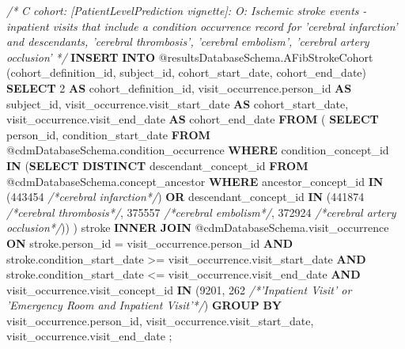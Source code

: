\documentclass[]{article}
\newenvironment{Shaded}{\begin{snugshade}}{\end{snugshade}}
\newcommand{\KeywordTok}[1]{\textcolor[rgb]{0.13,0.29,0.53}{\textbf{#1}}}
\newcommand{\DecValTok}[1]{\textcolor[rgb]{0.00,0.00,0.81}{#1}}
\newcommand{\CommentTok}[1]{\textcolor[rgb]{0.56,0.35,0.01}{\textit{#1}}}
\newcommand{\NormalTok}[1]{#1}
\begin{document}
\begin{Shaded}
\begin{Highlighting}[]
\CommentTok{/*}
\CommentTok{  C cohort:  [PatientLevelPrediction vignette]:  O: Ischemic stroke events}
\CommentTok{  - inpatient visits that include a condition occurrence record for }
\CommentTok{    'cerebral infarction' and descendants, 'cerebral thrombosis', }
\CommentTok{    'cerebral embolism', 'cerebral artery occlusion' }
\CommentTok{*/}
\KeywordTok{INSERT} \KeywordTok{INTO}\NormalTok{ @resultsDatabaseSchema.AFibStrokeCohort (cohort_definition_id, subject_id, }
\NormalTok{                                                     cohort_start_date, cohort_end_date)}
\KeywordTok{SELECT} \DecValTok{2} \KeywordTok{AS}\NormalTok{ cohort_definition_id,}
\NormalTok{  visit_occurrence.person_id }\KeywordTok{AS}\NormalTok{ subject_id,}
\NormalTok{  visit_occurrence.visit_start_date }\KeywordTok{AS}\NormalTok{ cohort_start_date,}
\NormalTok{  visit_occurrence.visit_end_date }\KeywordTok{AS}\NormalTok{ cohort_end_date}
\KeywordTok{FROM}  
\NormalTok{(}
  \KeywordTok{SELECT}\NormalTok{ person_id, condition_start_date}
  \KeywordTok{FROM}\NormalTok{ @cdmDatabaseSchema.condition_occurrence}
  \KeywordTok{WHERE}\NormalTok{ condition_concept_id }\KeywordTok{IN}\NormalTok{ (}\KeywordTok{SELECT} \KeywordTok{DISTINCT}\NormalTok{ descendant_concept_id }\KeywordTok{FROM} 
\NormalTok{  @cdmDatabaseSchema.concept_ancestor }\KeywordTok{WHERE}\NormalTok{ ancestor_concept_id }\KeywordTok{IN} 
\NormalTok{  (}\DecValTok{443454} \CommentTok{/*cerebral infarction*/}\NormalTok{) }\KeywordTok{OR}\NormalTok{ descendant_concept_id }\KeywordTok{IN} 
\NormalTok{  (}\DecValTok{441874} \CommentTok{/*cerebral thrombosis*/}\NormalTok{, }\DecValTok{375557} \CommentTok{/*cerebral embolism*/}\NormalTok{, }
   \DecValTok{372924} \CommentTok{/*cerebral artery occlusion*/}\NormalTok{))}
\NormalTok{) stroke}
\KeywordTok{INNER} \KeywordTok{JOIN}\NormalTok{ @cdmDatabaseSchema.visit_occurrence}
\KeywordTok{ON}\NormalTok{ stroke.person_id = visit_occurrence.person_id}
\KeywordTok{AND}\NormalTok{ stroke.condition_start_date >= visit_occurrence.visit_start_date}
\KeywordTok{AND}\NormalTok{ stroke.condition_start_date <= visit_occurrence.visit_end_date}
\KeywordTok{AND}\NormalTok{ visit_occurrence.visit_concept_id }\KeywordTok{IN}\NormalTok{ (}\DecValTok{9201}\NormalTok{, }\DecValTok{262} \CommentTok{/*'Inpatient Visit'  or }
\CommentTok{    'Emergency Room and Inpatient Visit'*/}\NormalTok{)}
\KeywordTok{GROUP} \KeywordTok{BY}\NormalTok{ visit_occurrence.person_id, visit_occurrence.visit_start_date, }
\NormalTok{         visit_occurrence.visit_end_date}
\NormalTok{;}
\end{Highlighting}
\end{Shaded}
\end{document}
